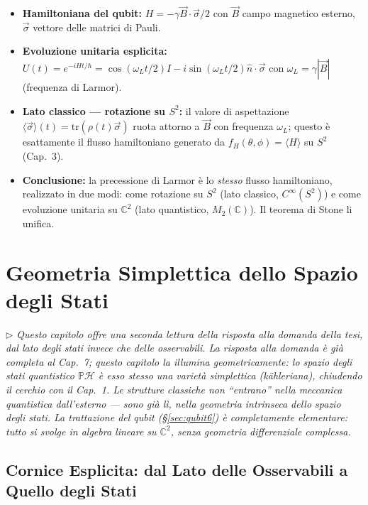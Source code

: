 \documentclass[12pt, a4paper]{article}
\newcommand{\nota}[1]{%
	\par\smallskip
	\noindent\textit{\small $\triangleright$\; #1}
	\par\smallskip
}
\begin{document}
	\begin{itemize}
		\item \textbf{Hamiltoniana del qubit:} $H = -\gamma \vec{B} \cdot \vec{\sigma}/2$
		con $\vec{B}$ campo magnetico esterno, $\vec{\sigma}$ vettore delle matrici di Pauli.
		\item \textbf{Evoluzione unitaria esplicita:}
		$U(t) = e^{-iHt/\hbar} = \cos(\omega_L t/2)I - i\sin(\omega_L t/2)\hat{n}\cdot\vec{\sigma}$
		con $\omega_L = \gamma|\vec{B}|$ (frequenza di Larmor).
		\item \textbf{Lato classico --- rotazione su $S^2$:} il valore di aspettazione
		$\langle\vec{\sigma}\rangle(t) = \mathrm{tr}(\rho(t)\vec{\sigma})$ ruota attorno a
		$\vec{B}$ con frequenza $\omega_L$; questo è esattamente il flusso hamiltoniano
		generato da $f_H(\theta,\phi) = \langle H\rangle$ su $S^2$ (Cap.\ 3).
		\item \textbf{Conclusione:} la precessione di Larmor è lo \emph{stesso} flusso
		hamiltoniano, realizzato in due modi: come rotazione su $S^2$ (lato classico,
		$C^\infty(S^2)$) e come evoluzione unitaria su $\mathbb{C}^2$ (lato quantistico,
		$M_2(\mathbb{C})$). Il teorema di Stone li unifica.
	\end{itemize}
	
	\newpage
	\section{Geometria Simplettica dello Spazio degli Stati}
	
	\nota{Questo capitolo offre una seconda lettura della risposta alla domanda della tesi,
		dal lato degli \emph{stati} invece che delle \emph{osservabili}. La risposta alla
		domanda è già completa al Cap.\ 7; questo capitolo la illumina geometricamente:
		lo spazio degli stati quantistico $\mathbb{P}\mathcal{H}$ è esso stesso una varietà
		simplettica (kähleriana), chiudendo il cerchio con il Cap.\ 1. Le strutture classiche
		non ``entrano'' nella meccanica quantistica dall'esterno --- sono già lì, nella
		geometria intrinseca dello spazio degli stati. La trattazione del qubit (§\ref{sec:qubit6})
		è completamente elementare: tutto si svolge in algebra lineare su $\mathbb{C}^2$,
		senza geometria differenziale complessa.}
	
	\subsection{Cornice Esplicita: dal Lato delle Osservabili a Quello degli Stati}
	
\end{document}
